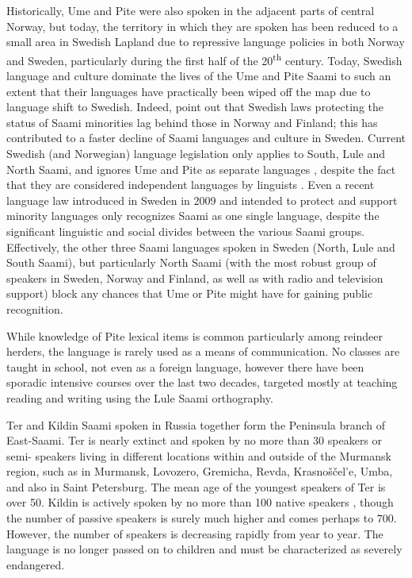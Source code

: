 \documentclass[a4paper,12pt]{article}
\begin{document}
Historically, Ume and Pite were also spoken in the adjacent parts of central Norway, but today, the territory in which they are spoken has been reduced to a small area in Swedish Lapland due to repressive language policies in both Norway and Sweden, particularly during the first half of the 20\textsuperscript{th} century. Today, Swedish language and culture dominate the lives of the Ume and Pite Saami to such an extent that their languages have practically been wiped off the map due to language shift to Swedish. Indeed, \citet[123]{blokland-etal2003} point out that Swedish laws protecting the status of Saami minorities lag behind those in Norway and Finland; this has contributed to a faster decline of Saami languages and culture in Sweden. Current Swedish (and Norwegian) language legislation only applies to South, Lule and North Saami, and ignores Ume and Pite as separate languages \cite[180]{kulonen-etal2005}, despite the fact that they are considered independent languages by linguists \citep[cf.][]{UNESCO1993,sammallahti1998b}. Even a recent language law introduced in Sweden in 2009 and intended to protect and support minority languages only recognizes Saami as one single language, despite the significant linguistic and social divides between the various Saami groups. Effectively, the other three Saami languages spoken in Sweden (North, Lule and South Saami), but particularly North Saami (with the most robust group of speakers in Sweden, Norway and Finland, as well as with radio and television support) block any chances that Ume or Pite might have for gaining public recognition. 

While knowledge of Pite lexical items is common particularly among reindeer herders, the language is rarely used as a means of communication. No classes are taught in school, not even as a foreign language, however there have been sporadic intensive courses over the last two decades, targeted mostly at teaching reading and writing using the Lule Saami orthography.

Ter and Kildin Saami spoken in Russia together form the Peninsula branch of East-Saami. Ter is nearly extinct and spoken by no more than 30 speakers or semi- speakers living in different locations within and outside of the Murmansk region, such as in Murmansk, Lovozero, Gremicha, Revda, Krasnoščel'e, Umba, and also in Saint Petersburg. The mean age of the youngest speakers of Ter is over 50. Kildin is actively spoken by no more than 100 native speakers \citep{scheller2010}, though the number of passive speakers is surely much higher and comes perhaps to 700. However, the number of speakers is decreasing rapidly from year to year. The language is no longer passed on to children and must be characterized as severely endangered.
\end{document}
